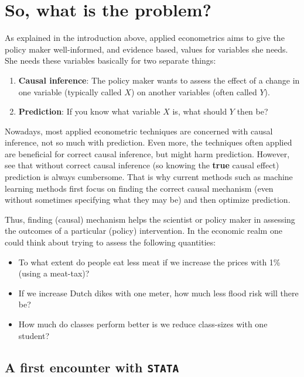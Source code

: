\documentclass[
]{book}
\providecommand{\tightlist}{%
  \setlength{\itemsep}{0pt}\setlength{\parskip}{0pt}}
\begin{document}
\hypertarget{secproblem}{%
\section{So, what is the problem?}\label{secproblem}}

As explained in the introduction above, applied econometrics aims to give the policy maker well-informed, and evidence based, values for variables she needs. She needs these variables basically for two separate things:

\begin{enumerate}
\def\labelenumi{\arabic{enumi}.}
\tightlist
\item
  \textbf{Causal inference}: The policy maker wants to assess the effect of a change in one variable (typically called \(X\)) on another variables (often called \(Y\)).
\item
  \textbf{Prediction}: If you know what variable \(X\) is, what should \(Y\) then be?
\end{enumerate}

Nowadays, most applied econometric techniques are concerned with causal inference, not so much with prediction. Even more, the techniques often applied are beneficial for correct causal inference, but might harm prediction. However, see that without correct causal inference (so knowing the \textbf{true} causal effect) prediction is always cumbersome. That is why current methods such as machine learning methods first focus on finding the correct causal mechanism (even without sometimes specifying what they may be) and then optimize prediction.

Thus, finding (causal) mechanism helps the scientist or policy maker in assessing the outcomes of a particular (policy) intervention. In the economic realm one could think about trying to assess the following quantities:

\begin{itemize}
\tightlist
\item
  To what extent do people eat less meat if we increase the prices with 1\% (using a meat-tax)?
\item
  If we increase Dutch dikes with one meter, how much less flood risk will there be?
\item
  How much do classes perform better is we reduce class-sizes with one student?
\end{itemize}

\hypertarget{a-first-encounter-with-stata}{%
\subsection{\texorpdfstring{A first encounter with \texttt{STATA}}{A first encounter with STATA}}\label{a-first-encounter-with-stata}}
\end{document}
